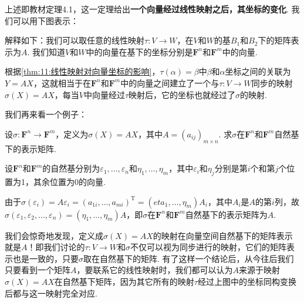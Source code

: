 上述即教材定理4.1，这一定理给出\textbf{一个向量经过线性映射之后，其坐标的变化}. 我们可以用下图表示：
\begin{figure}[htbp]
    \centering
\end{figure}

解释如下：我们可以取任意的线性映射$\tau:V\to W$，在$V$和$W$的基$B_1$和$B_2$下的矩阵表示为$A$. 我们知道$V$和$W$中的向量在基下的坐标分别是$\mathbf{F}^n$和$\mathbf{F}^m$中的向量.

根据\autoref{thm:11:线性映射对向量坐标的影响}，$\tau(\alpha)=\beta$中$\beta$和$\alpha$坐标之间的关联为$Y=AX$，这就相当于在$\mathbf{F}^n$和$\mathbf{F}^m$中的向量之间建立了一个与$\tau:V\to W$同步的映射$\sigma(X)=AX$，每当$V$中向量经过$\tau$映射后，它的坐标也就经过了$\sigma$的映射.

我们再来看一个例子：
\begin{example}
    设$\sigma:\mathbf{F}^n\to\mathbf{F}^m$，定义为$\sigma(X)=AX$，其中$A=(a_{ij})_{m\times n}$. 求$\sigma$在$\mathbf{F}^n$和$\mathbf{F}^m$自然基下的表示矩阵.
\end{example}

\begin{solution}
    设$\mathbf{F}^n$和$\mathbf{F}^m$的自然基分别为$\varepsilon_1,\ldots,\varepsilon_n$和$\eta_1,\ldots,\eta_m$，其中$\varepsilon_i$和$\eta_j$分别是第$i$个和第$j$个位置为1，其余位置为0的向量.

    由于$\sigma(\varepsilon_i)=A\varepsilon_i=(a_{1i},\ldots,a_{mi})^\mathrm{T}=(eta_1,\ldots,\eta_m)A_i$，其中$A_i$是$A$的第$i$列，故$\sigma(\varepsilon_1,\varepsilon_2,\ldots,\varepsilon_n)=(\eta_1,\ldots,\eta_m)A$，即$\sigma$在$\mathbf{F}^n$和$\mathbf{F}^m$自然基下的表示矩阵为$A$.
\end{solution}

我们会惊奇地发现，定义成$\sigma(X)=AX$的映射在向量空间自然基下的矩阵表示就是$A$！即我们讨论的$\tau:V\to W$和$\sigma$不仅可以视为同步进行的映射，它们的矩阵表示也是一致的，只要$\sigma$取在自然基下的矩阵. 有了这样一个结论后，从今往后我们只要看到一个矩阵$A$，要联系它的线性映射时，我们都可以认为$A$来源于映射$\sigma(X)=AX$在自然基下矩阵，因为其它所有的映射$\tau$经过上图中的坐标同构变换后都与这一映射完全对应.

